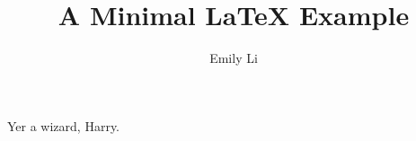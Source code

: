 \documentclass {article}
\title {A Minimal LaTeX Example}
\author {Emily Li}
\begin{document}
\maketitle
Yer a wizard, Harry.
\end{document}
